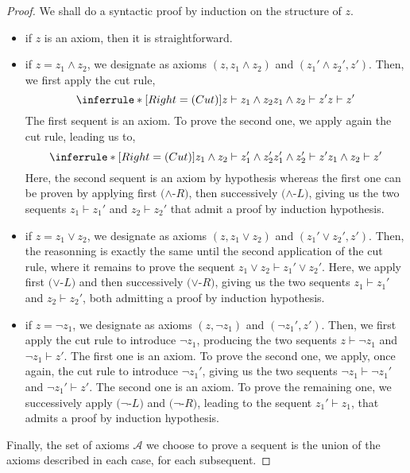 \documentclass[a4paper, 11pt]{article}
\begin{document}
    \begin{proof}
	    We shall do a syntactic proof by induction on the structure of $z$.
	    \begin{itemize}
		    \item
			    if $z$ is an axiom, then it is straightforward.
		    \item
			    if $z=z_1\wedge z_2$, we designate as axioms
			    $(z, z_1\wedge z_2)$ and $(z_1'\wedge z_2',z')$. Then, we first 
			    apply the cut rule,
			    \[
				\inferrule*[Right=(Cut)]
				{z\vdash z_1\wedge z_2 \\ z_1\wedge z_2\vdash z'}
				{z\vdash z'}
			    \]
			    The first sequent is an axiom. To prove 
			    the second one, we apply again the cut rule, leading us to,
			    \[
				\inferrule*[Right=(Cut)]
				{z_1\wedge z_2\vdash z_1'\wedge z_2'\\ z_1'\wedge z_2'\vdash z'}
				{z_1\wedge z_2\vdash z'}
			    \]
			    Here, the second sequent is an axiom by hypothesis whereas the first one 
			    can be proven by applying
			    first $(\wedge$-$R)$, then successively $(\wedge$-$L)$, giving us the two
			    sequents $z_1\vdash z_1'$ and $z_2\vdash z_2'$ that admit a proof by
			    induction hypothesis.
		    \item
			    if $z=z_1\vee z_2$, we designate as axioms $(z,z_1\vee z_2)$ and 
			    $(z_1'\vee z_2',z')$.
			    Then, the reasonning is exactly the same until the second 
			    application of the cut rule, where it remains to prove the sequent 
			    $z_1\vee z_2\vdash z_1'\vee z_2'$. Here, we apply first $(\vee$-$L)$ and then
			    successively $(\vee$-$R)$, giving us the two sequents $z_1\vdash z_1'$ and
			    $z_2\vdash z_2'$, both admitting a proof by induction hypothesis.
		    \item
			    if $z=\neg z_1$, we designate as axioms $(z,\neg z_1)$ and $(\neg z_1',z')$. 
			    Then, we first apply the cut rule to introduce $\neg z_1$,
			    producing the two sequents $z\vdash \neg z_1$ and $\neg z_1\vdash z'$.
			    The first one is an axiom. To prove the second one, we apply, once again,
			    the cut rule to introduce $\neg z_1'$, giving us the two sequents
			    $\neg z_1\vdash\neg z_1'$ and $\neg z_1'\vdash z'$. The second one is an axiom. To
			    prove the remaining one, we successively apply $(\neg$-$L)$ and $(\neg$-$R)$,
			    leading to the sequent $z_1'\vdash z_1$, that admits a proof by induction
			    hypothesis.
	    \end{itemize}
	    Finally, the set of axioms $\mathcal{A}$ we choose to prove a sequent is the union of the 
	    axioms described in each case, for each subsequent.
    \end{proof}
\end{document}

